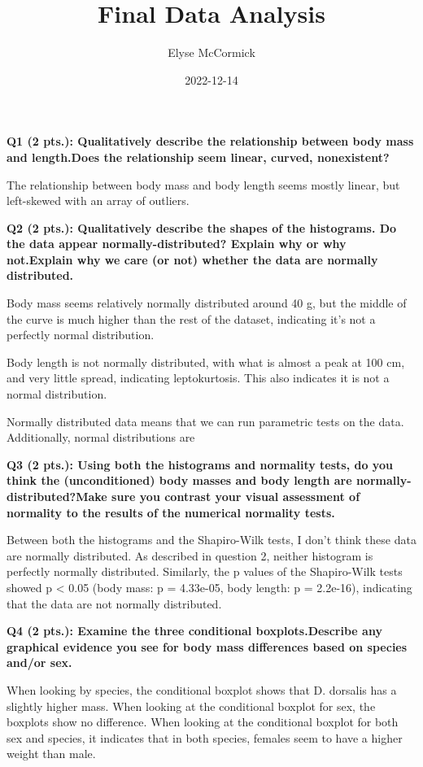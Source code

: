 \documentclass[
]{article}
\title{Final Data Analysis}
\author{Elyse McCormick}
\date{2022-12-14}
\begin{document}
\maketitle

\textbf{Q1 (2 pts.): Qualitatively describe the relationship between
body mass and length.Does the relationship seem linear, curved,
nonexistent?}

The relationship between body mass and body length seems mostly linear,
but left-skewed with an array of outliers.

\textbf{Q2 (2 pts.): Qualitatively describe the shapes of the
histograms. Do the data appear normally-distributed? Explain why or why
not.Explain why we care (or not) whether the data are normally
distributed.}

Body mass seems relatively normally distributed around 40 g, but the
middle of the curve is much higher than the rest of the dataset,
indicating it's not a perfectly normal distribution.

Body length is not normally distributed, with what is almost a peak at
100 cm, and very little spread, indicating leptokurtosis. This also
indicates it is not a normal distribution.

Normally distributed data means that we can run parametric tests on the
data. Additionally, normal distributions are

\textbf{Q3 (2 pts.): Using both the histograms and normality tests, do
you think the (unconditioned) body masses and body length are
normally-distributed?Make sure you contrast your visual assessment of
normality to the results of the numerical normality tests.}

Between both the histograms and the Shapiro-Wilk tests, I don't think
these data are normally distributed. As described in question 2, neither
histogram is perfectly normally distributed. Similarly, the p values of
the Shapiro-Wilk tests showed p \textless{} 0.05 (body mass: p =
4.33e-05, body length: p = 2.2e-16), indicating that the data are not
normally distributed.

\textbf{Q4 (2 pts.): Examine the three conditional boxplots.Describe any
graphical evidence you see for body mass differences based on species
and/or sex.}

When looking by species, the conditional boxplot shows that D. dorsalis
has a slightly higher mass. When looking at the conditional boxplot for
sex, the boxplots show no difference. When looking at the conditional
boxplot for both sex and species, it indicates that in both species,
females seem to have a higher weight than male.
\end{document}
